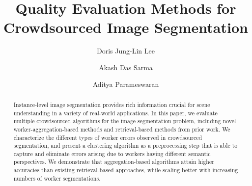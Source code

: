 \documentclass[sigconf]{acmart}
\begin{document}
           \title{Quality Evaluation Methods for Crowdsourced Image Segmentation}
        \author{Doris Jung-Lin Lee}
        \author{Akash Das Sarma}
        \author{Aditya Parameswaran}
        \begin{abstract}
           \vspace{-7pt}
           Instance-level image segmentation provides rich information crucial for scene understanding in a variety of real-world applications. In this paper, we evaluate multiple crowdsourced algorithms for the image segmentation problem, including novel worker-aggregation-based methods and retrieval-based methods from prior work. We characterize the different types of worker errors observed in crowdsourced segmentation, and present a clustering algorithm as a preprocessing step that is able to capture and eliminate errors arising due to workers having different semantic perspectives. We demonstrate that aggregation-based algorithms attain higher accuracies than existing retrieval-based approaches, while scaling better with increasing numbers of worker segmentations. 
           \vspace{-2pt}
          \end{abstract}
           \maketitle
          
          
          
          
          
          
          


\end{document}
